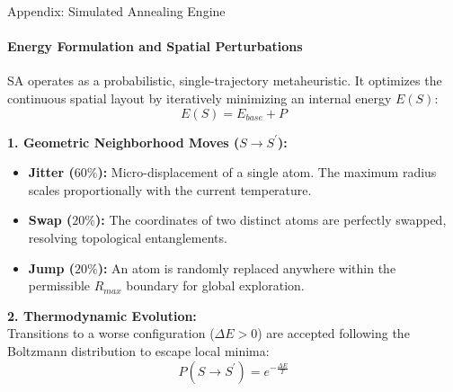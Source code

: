 \documentclass[10pt, aspectratio=169]{beamer}
\begin{document}
\begin{frame}{Appendix: Simulated Annealing Engine}
\framesubtitle{Energy Formulation and Spatial Perturbations}
    SA operates as a probabilistic, single-trajectory metaheuristic. It optimizes the continuous spatial layout by iteratively minimizing an internal energy $E(S)$:
    $$ E(S) = E_{base} + P $$

    \vspace{0.2cm}
    \textbf{1. Geometric Neighborhood Moves ($S \to S^{\prime}$):}
    \begin{itemize}
        \item \textbf{Jitter ($60\%$):} Micro-displacement of a single atom. The maximum radius scales proportionally with the current temperature.
        \item \textbf{Swap ($20\%$):} The coordinates of two distinct atoms are perfectly swapped, resolving topological entanglements.
        \item \textbf{Jump ($20\%$):} An atom is randomly replaced anywhere within the permissible $R_{max}$ boundary for global exploration.
    \end{itemize}

    \vspace{0.2cm}
    \textbf{2. Thermodynamic Evolution:} \\
    Transitions to a worse configuration ($\Delta E > 0$) are accepted following the Boltzmann distribution to escape local minima:
    $$ P(S \to S^{\prime}) = e^{-\frac{\Delta E}{T}} $$
\end{frame}
\end{document}
